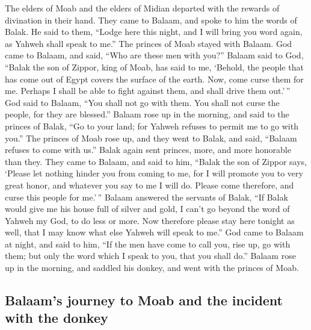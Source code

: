  The elders of Moab and the elders of Midian departed with
the rewards of divination in their hand. They came to Balaam, and spoke
to him the words of Balak.  He said to them, ``Lodge here
this night, and I will bring you word again, as Yahweh shall speak to
me.'' The princes of Moab stayed with Balaam.  God came to
Balaam, and said, ``Who are these men with you?''  Balaam
said to God, ``Balak the son of Zippor, king of Moab, has said to me,
 `Behold, the people that has come out of Egypt covers
the surface of the earth. Now, come curse them for me. Perhaps I shall
be able to fight against them, and shall drive them out.'\,''
 God said to Balaam, ``You shall not go with them. You
shall not curse the people, for they are blessed.'' 
Balaam rose up in the morning, and said to the princes of Balak, ``Go to
your land; for Yahweh refuses to permit me to go with you.''
 The princes of Moab rose up, and they went to Balak, and
said, ``Balaam refuses to come with us.''  Balak again
sent princes, more, and more honorable than they.  They
came to Balaam, and said to him, ``Balak the son of Zippor says, `Please
let nothing hinder you from coming to me,  for I will
promote you to very great honor, and whatever you say to me I will do.
Please come therefore, and curse this people for me.'\,''
 Balaam answered the servants of Balak, ``If Balak would
give me his house full of silver and gold, I can't go beyond the word of
Yahweh my God, to do less or more.  Now therefore please
stay here tonight as well, that I may know what else Yahweh will speak
to me.''  God came to Balaam at night, and said to him,
``If the men have come to call you, rise up, go with them; but only the
word which I speak to you, that you shall do.''  Balaam
rose up in the morning, and saddled his donkey, and went with the
princes of Moab.

\hypertarget{balaams-journey-to-moab-and-the-incident-with-the-donkey}{%
\subsection{Balaam's journey to Moab and the incident with the
donkey}\label{balaams-journey-to-moab-and-the-incident-with-the-donkey}}

